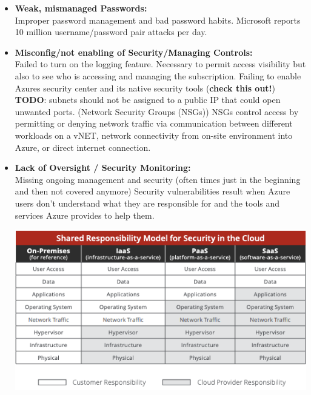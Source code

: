 \documentclass[12pt]{article}
\begin{document}
\begin{itemize}
    
    \item \textbf{Weak, mismanaged Passwords:} \footnotemark[2] \footnotemark[4] \\ 
    Improper password management and bad password habits. Microsoft reports 10 million username/password pair attacks per day.
    
    
    \item \textbf{Misconfig/not enabling of Security/Managing Controls:} \footnotemark[2] \\ 
    Failed to turn on the logging feature. Necessary to permit access visibility but also to see who is accessing and managing the subscription.
    Failing to enable Azures security center and its native security tools (\textbf{check this out!}) \\
    \textbf{TODO}: subnets should not be assigned to a public IP that could open unwanted ports. (Network Security Groups (NSGs)) NSGs control access by permitting or denying network traffic via communication between different workloads on a vNET, network connectivity from on-site environment into Azure, or direct internet connection.
    
    \item \textbf{Lack of Oversight / Security Monitoring:} \footnotemark[2] \footnotemark[3] \\ 
    Missing ongoing management and security (often times just in the beginning and then not covered anymore)
    Security vulnerabilities result when Azure users don’t understand what they are responsible for and the tools and services Azure provides to help them. 
    \begin{center}
        \includegraphics[scale=0.5]{../images/McAfee_Responsibility_Model.png} \footnotemark[5] 
    \end{center}
    

\end{itemize}
\end{document}

